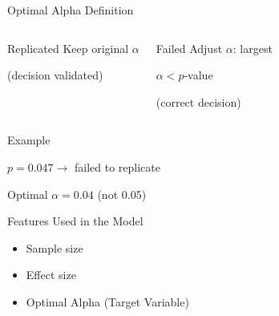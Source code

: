 \begin{frame}{Optimal Alpha Definition}
	
	\begin{columns}[T]
		
		\begin{block}{Replicated}
			Keep original $\alpha$  
			
			(decision validated)
		\end{block}
		
		\begin{alertblock}{Failed}
			Adjust $\alpha$: largest  
			
			$\alpha < p$-value  
			
			(correct decision)
		\end{alertblock}
		
	\end{columns}
	
	\vspace{0.5cm}
	
	\begin{exampleblock}{Example}
		
		$p = 0.047 \rightarrow$ failed to replicate  
		
		Optimal $\alpha = 0.04$ (not 0.05)
		
	\end{exampleblock}
	
	\vspace{0.2cm}
	
	\begin{block}{Features Used in the Model}
		
		\begin{itemize}
			\item Sample size
			\item Effect size
			\item Optimal Alpha (Target Variable)
		\end{itemize}
		
	\end{block}
	
\end{frame}


